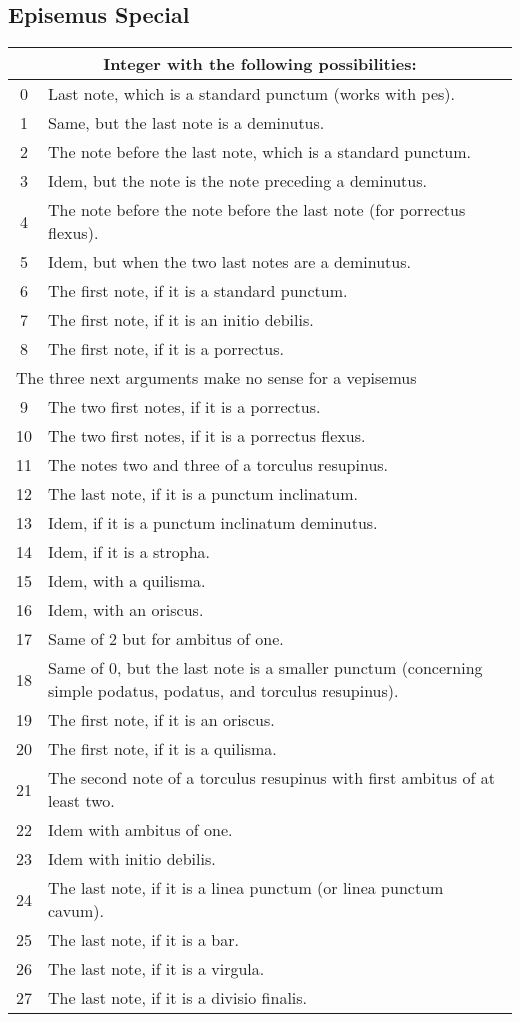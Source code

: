 \subsection{Episemus Special}\label{EpisemusSpecial}
\begin{tabular}{cp{}}
  \multicolumn{2}{c}{Integer with the following possibilities:} \\
  \hline
  0 & Last note, which is a standard punctum (works with pes).\\
  1 & Same, but the last note is a deminutus.\\
  2 & The note before the last note, which is a standard punctum.\\
  3 & Idem, but the note is the note preceding a deminutus.\\
  4 & The note before the note before the last note (for porrectus flexus).\\
  5 & Idem, but when the two last notes are a deminutus.\\
  6 & The first note, if it is a standard punctum.\\
  7 & The first note, if it is an initio debilis.\\
  8 & The first note, if it is a porrectus.\\
  \multicolumn{2}{l}{The three next arguments make no sense for a vepisemus}\\
  9 & The two first notes, if it is a porrectus.\\
  10 & The two first notes, if it is a porrectus flexus.\\
  11 & The notes two and three of a torculus resupinus.\\
  12 & The last note, if it is a punctum inclinatum.\\
  13 & Idem, if it is a punctum inclinatum deminutus.\\
  14 & Idem, if it is a stropha.\\
  15 & Idem, with a quilisma.\\
  16 & Idem, with an oriscus.\\
  17 & Same of 2 but for ambitus of one.\\
  18 & Same of 0, but the last note is a smaller punctum (concerning simple podatus, podatus, and torculus resupinus).\\
  19 & The first note, if it is an oriscus.\\
  20 & The first note, if it is a quilisma.\\
  21 & The second note of a torculus resupinus with first ambitus of at least two.\\
  22 & Idem with ambitus of one.\\
  23 & Idem with initio debilis.\\
  24 & The last note, if it is a linea punctum (or linea punctum cavum).\\
  25 & The last note, if it is a bar.\\
  26 & The last note, if it is a virgula.\\
  27 & The last note, if it is a divisio finalis.\\
\end{tabular}

